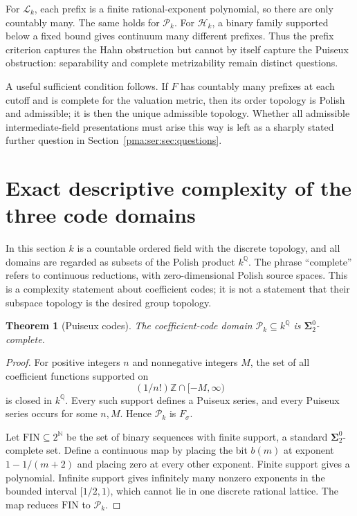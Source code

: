 \documentclass[11pt]{article}
\numberwithin{equation}{section}
\newtheorem{theorem}{Theorem}[section]
\theoremstyle{definition}
\theoremstyle{remark}
\newcommand{\N}{\mathbb N}
\newcommand{\Z}{\mathbb Z}
\newcommand{\Q}{\mathbb Q}
\newcommand{\FIN}{\mathrm{FIN}}
\newcommand{\Pk}{\mathcal P_k}
\newcommand{\Lk}{\mathcal L_k}
\newcommand{\Hk}{\mathcal H_k}
\newcommand{\Sf}{\boldsymbol{\Sigma}^{0}_{2}}
\begin{document}
For $\Lk$, each prefix is a finite rational-exponent polynomial, so there are
only countably many. The same holds for $\Pk$. For $\Hk$, a binary family
supported below a fixed bound gives continuum many different prefixes.
Thus the prefix criterion captures the Hahn obstruction but cannot by itself
capture the Puiseux obstruction: separability and complete metrizability
remain distinct questions.

A useful sufficient condition follows. If $F$ has countably many prefixes at
each cutoff and is complete for the valuation metric, then its order topology
is Polish and admissible; it is then the unique admissible topology. Whether
all admissible intermediate-field presentations must arise this way is left
as a sharply stated further question in Section~\ref{pma:ser:sec:questions}.

\section{Exact descriptive complexity of the three code domains}
\label{pma:ser:sec:complexity}

In this section $k$ is a countable ordered field with the discrete topology,
and all domains are regarded as subsets of the Polish product $k^\Q$.
The phrase ``complete'' refers to continuous reductions, with zero-dimensional
Polish source spaces. This is a complexity statement about coefficient codes;
it is not a statement that their subspace topology is the desired group
topology.

\begin{theorem}[Puiseux codes]\label{pma:ser:thm:pcodes}
The coefficient-code domain $\Pk\subseteq k^\Q$ is $\Sf$-complete.
\end{theorem}
\begin{proof}
For positive integers $n$ and nonnegative integers $M$, the set of all
coefficient functions supported on
\[
 (1/n!)\Z\cap[-M,\infty)
\]
is closed in $k^\Q$. Every such support defines a Puiseux series, and every
Puiseux series occurs for some $n,M$. Hence $\Pk$ is $F_\sigma$.

Let $\FIN\subseteq2^\N$ be the set of binary sequences with finite support,
a standard $\Sf$-complete set. Define a continuous map by placing the bit
$b(m)$ at exponent $1-1/(m+2)$ and placing zero at every other exponent.
Finite support gives a polynomial. Infinite support gives infinitely many
nonzero exponents in the bounded interval $[1/2,1)$, which cannot lie in one
discrete rational lattice. The map reduces $\FIN$ to $\Pk$.
\end{proof}
\end{document}
